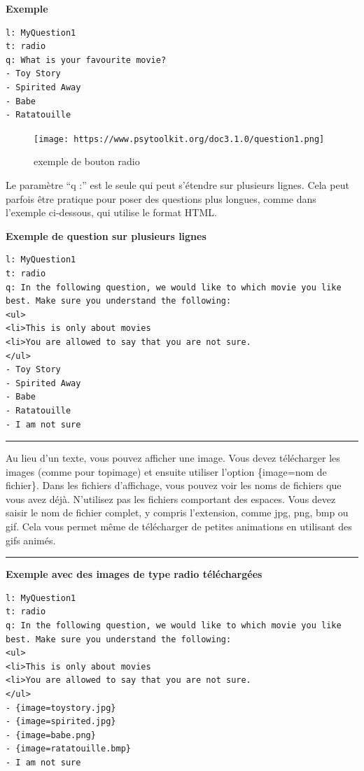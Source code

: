\documentclass[
]{book}
\begin{document}
\textbf{Exemple}

\begin{verbatim}
l: MyQuestion1
t: radio
q: What is your favourite movie?
- Toy Story
- Spirited Away
- Babe
- Ratatouille
\end{verbatim}

\begin{figure}
\centering
\texttt{[image: https://www.psytoolkit.org/doc3.1.0/question1.png]}
\caption{exemple de bouton radio}
\end{figure}

Le paramètre ``q :'' est le seule qui peut s'étendre sur plusieurs
lignes. Cela peut parfois être pratique pour poser des questions plus
longues, comme dans l'exemple ci-dessous, qui utilise le format HTML.

\textbf{Exemple de question sur plusieurs lignes}

\begin{verbatim}
l: MyQuestion1
t: radio
q: In the following question, we would like to which movie you like
best. Make sure you understand the following:
<ul>
<li>This is only about movies
<li>You are allowed to say that you are not sure.
</ul>
- Toy Story
- Spirited Away
- Babe
- Ratatouille
- I am not sure
\end{verbatim}

\begin{center}\rule{0.5\linewidth}{\linethickness}\end{center}

Au lieu d'un texte, vous pouvez afficher une image. Vous devez
télécharger les images (comme pour topimage) et ensuite utiliser
l'option \{image=nom de fichier\}. Dans les fichiers d'affichage, vous
pouvez voir les noms de fichiers que vous avez déjà. N'utilisez pas les
fichiers comportant des espaces. Vous devez saisir le nom de fichier
complet, y compris l'extension, comme jpg, png, bmp ou gif. Cela vous
permet même de télécharger de petites animations en utilisant des gifs
animés.

\begin{center}\rule{0.5\linewidth}{\linethickness}\end{center}

\textbf{Exemple avec des images de type radio téléchargées}

\begin{verbatim}
l: MyQuestion1
t: radio
q: In the following question, we would like to which movie you like
best. Make sure you understand the following:
<ul>
<li>This is only about movies
<li>You are allowed to say that you are not sure.
</ul>
- {image=toystory.jpg}
- {image=spirited.jpg}
- {image=babe.png}
- {image=ratatouille.bmp}
- I am not sure
\end{verbatim}
\end{document}
